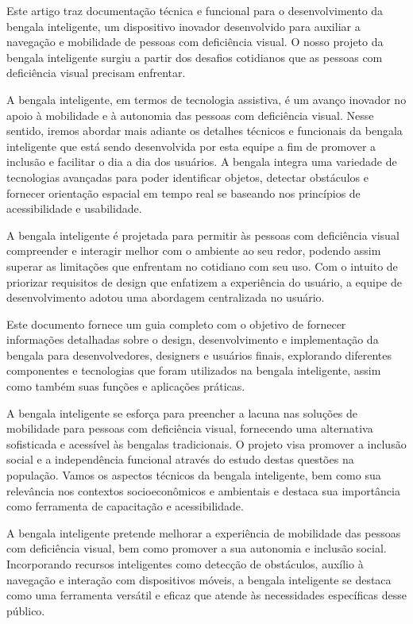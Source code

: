 Este artigo traz documentação técnica e funcional para o desenvolvimento da bengala inteligente, um dispositivo inovador desenvolvido para auxiliar a navegação e mobilidade de pessoas com deficiência visual. O nosso projeto da bengala inteligente surgiu a partir dos desafios cotidianos que as pessoas com deficiência visual precisam enfrentar.

A bengala inteligente, em termos de tecnologia assistiva, é um avanço inovador no apoio à mobilidade e à autonomia das pessoas com deficiência visual. Nesse sentido, iremos abordar mais adiante os detalhes técnicos e funcionais da bengala inteligente que está sendo desenvolvida por esta equipe a fim de promover a inclusão e facilitar o dia a dia dos usuários. A bengala integra uma variedade de tecnologias avançadas para poder identificar objetos, detectar obstáculos e fornecer orientação espacial em tempo real se baseando nos princípios de acessibilidade e usabilidade.

A bengala inteligente é projetada para permitir às pessoas com deficiência visual compreender e interagir melhor com o ambiente ao seu redor, podendo assim superar as limitações que enfrentam no cotidiano com seu uso. Com o intuito de priorizar requisitos de design que enfatizem a experiência do usuário, a equipe de desenvolvimento adotou uma abordagem centralizada no usuário.

Este documento fornece um guia completo com o objetivo de fornecer informações detalhadas sobre o design, desenvolvimento e implementação da bengala para desenvolvedores, designers e usuários finais, explorando diferentes componentes e tecnologias que foram utilizados na bengala inteligente, assim como também suas funções e aplicações práticas.

A bengala inteligente se esforça para preencher a lacuna nas soluções de mobilidade para pessoas com deficiência visual, fornecendo uma alternativa sofisticada e acessível às bengalas tradicionais. O projeto visa promover a inclusão social e a independência funcional através do estudo destas questões na população. Vamos os aspectos técnicos da bengala inteligente, bem como sua relevância nos contextos socioeconômicos e ambientais e destaca sua importância como ferramenta de capacitação e acessibilidade.

A bengala inteligente pretende melhorar a experiência de mobilidade das pessoas com deficiência visual, bem como promover a sua autonomia e inclusão social. Incorporando recursos inteligentes como detecção de obstáculos, auxílio à navegação e interação com dispositivos móveis, a bengala inteligente se destaca como uma ferramenta versátil e eficaz que atende às necessidades específicas desse público.

